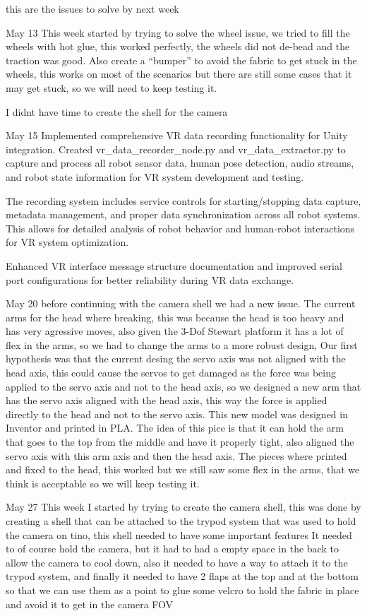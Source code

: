 this are the issues to solve by next week


May 13
This week started by trying to solve the wheel issue, we tried to fill the wheels with hot glue, this worked perfectly, the wheels did not de-bead and the traction was good.
Also create a ``bumper'' to avoid the fabric to get stuck in the wheels, this works on most of the scenarios but there are still some cases that it may get stuck, so we will need to keep testing it.

I didnt have time to create the shell for the camera

May 15
Implemented comprehensive VR data recording functionality for Unity integration. Created vr\_data\_recorder\_node.py and vr\_data\_extractor.py to capture and process all robot sensor data, human pose detection, audio streams, and robot state information for VR system development and testing.

The recording system includes service controls for starting/stopping data capture, metadata management, and proper data synchronization across all robot systems. This allows for detailed analysis of robot behavior and human-robot interactions for VR system optimization.

Enhanced VR interface message structure documentation and improved serial port configurations for better reliability during VR data exchange.

May 20
before continuing with the camera shell we had a new issue. The current arms for the head where breaking, this was because the head is too heavy and has very agressive moves, also given the 3-Dof Stewart platform it has a lot of flex in the arms, so we had to change the arms to a more robust design, Our first hypothesis was that the current desing the servo axis was not aligned with the head axis, this could cause the servos to get damaged as the force was being applied to the servo axis and not to the head axis, so we designed a new arm that has the servo axis aligned with the head axis, this way the force is applied directly to the head and not to the servo axis.
This new model was designed in Inventor and printed in PLA. The idea of this pice is that it can hold the arm that goes to the top from the middle and have it properly tight, also aligned the servo axis with this arm axis and then the head axis.
The pieces where printed and fixed to the head, this worked but we still saw some flex in the arms, that we think is acceptable so we will keep testing it.

May 27
This week I started by trying to create the camera shell, this was done by creating a shell that can be attached to the trypod system that was used to hold the camera on tino, this shell needed to have some important features
It needed to of course hold the camera, but it had to had a empty space in the back to allow the camera to cool down, also it needed to have a way to attach it to the trypod system, and finally it needed to have 2 flaps at the top and at the bottom so that we can use them as a point to glue some velcro to hold the fabric in place and avoid it to get in the camera FOV

